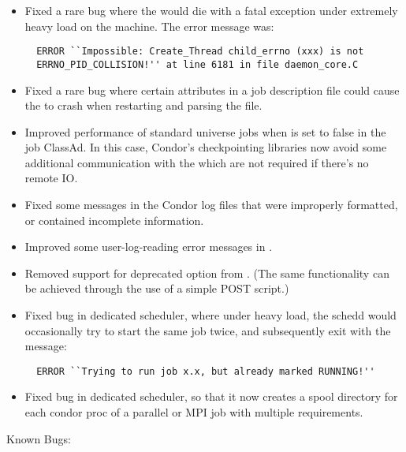 \begin{itemize}
\item Fixed a rare bug where the  would die with a
  fatal exception under extremely heavy load on the machine.
  The error message was:
\begin{verbatim}  
  ERROR ``Impossible: Create_Thread child_errno (xxx) is not
  ERRNO_PID_COLLISION!'' at line 6181 in file daemon_core.C
\end{verbatim}  

\item Fixed a rare bug where certain attributes in a job description
  file could cause the  to crash when restarting and
  parsing the  file.

\item Improved performance of standard universe jobs when
   is set to false in the job ClassAd.  
  In this case, Condor's checkpointing libraries now avoid some
  additional communication with the  which are not
  required if there's no remote IO.

\item Fixed some messages in the Condor log files that were improperly
  formatted, or contained incomplete information.

\item Improved some user-log-reading error messages in .

\item Removed support for deprecated  option from
.  (The same functionality can be achieved through the
use of a simple POST script.)

\item Fixed bug in dedicated scheduler, where under heavy load, the
  schedd would occasionally try to start the same job twice, and
  subsequently exit with the message:
\begin{verbatim}  
  ERROR ``Trying to run job x.x, but already marked RUNNING!''
\end{verbatim}  

\item Fixed bug in dedicated scheduler, so that it now creates a 
  spool directory for each condor proc of a parallel or MPI job
  with multiple requirements.

\end{itemize}

\noindent Known Bugs:

